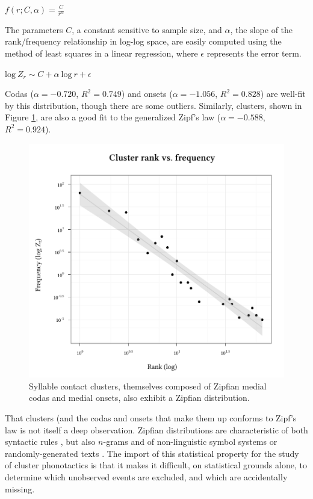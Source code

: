\ex $\displaystyle f(r; C, \alpha) = \frac{C}{r^\alpha}$ \xe

\noindent
The parameters $C$, a constant sensitive to sample size, and $\alpha$, the slope of the rank/frequency relationship in log-log space, are easily computed using the method of least squares in a linear regression, where $\epsilon$ represents the error term.

\ex $\displaystyle \textrm{log}~Z_r \sim C + \alpha~\textrm{log}~r + \epsilon$ \xe

\noindent
Codas ($\alpha = -0.720$, $R^2 = 0.749$) and onsets ($\alpha = -1.056$, $R^2 = 0.828$) are well-fit by this distribution, though there are some outliers. Similarly, clusters, shown in Figure \ref{clus}, are also a good fit to the generalized Zipf's law ($\alpha = -0.588$, $R^2 = 0.924$). 

\begin{figure}
\centering
\includegraphics{cluster.pdf}
\caption{Syllable contact clusters, themselves composed of Zipfian medial codas and medial onsets, also exhibit a Zipfian distribution.}
\label{clus}
\end{figure}

That clusters (and the codas and onsets that make them up conforms to Zipf's law is not itself a deep observation. Zipfian distributions are characteristic of both syntactic rules \citep{Yang2009}, but also $n$-grams \citep{Baroni2009} and of non-linguistic symbol systems \citep{Chomsky1958,Sproat2010} or randomly-generated texts \citep{Miller1957,Li1992}. The import of this statistical property for the study of cluster phonotactics is that it makes it difficult, on statistical grounds alone, to determine which unobserved events are excluded, and which are accidentally missing. 

